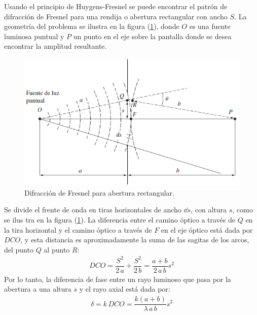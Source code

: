 \documentclass[14pt]{extarticle}
\begin{document}
Usando el principio de Huygens-Fresnel se puede encontrar el patrón de difracción de Fresnel para una rendija o abertura rectangular con ancho $S$. La geometría del problema se ilustra en la figura (\ref{fig:figura_X_05}), donde $O$ es una fuente luminosa puntual y $P$ un punto en el eje sobre la pantalla donde se desea encontrar la amplitud resultante.
\begin{figure}[H]
    \centering
    \includegraphics[scale=1]{Imagenes/Difraccion_05.png}
    \caption{Difracción de Fresnel para abertura rectangular.}
    \label{fig:figura_X_05}
\end{figure}
Se divide el frente de onda en tiras horizontales de ancho $\dd{s}$, con altura $s$, como se ilus tra en la figura (\ref{fig:figura_X_05}). La diferencia entre el camino óptico a través de $Q$ en la tira horizontal y el camino óptico a través de $F$ en el eje óptico está dada por $DCO$, y esta distancia es aproximadamente la suma de las sagitas de los arcos, del punto $Q$ al punto $R$:
\begin{align}
DCO = \dfrac{S^{2}}{2 \, a} + \dfrac{S^{2}}{2 \, b} = \dfrac{a + b}{2 \, a \, b} s^{2}
\label{eq:ecuacion_X_11}
\end{align}
Por lo tanto, la diferencia de fase entre un rayo luminoso que pasa por la abertura a una altura $s$ y el rayo axial está dada por:
\begin{align}
\delta =  k \, DCO = \dfrac{k (a + b)}{\lambda \, a \, b} s^{2}
\label{eq:ecuacion_X_12}
\end{align}
\end{document}
